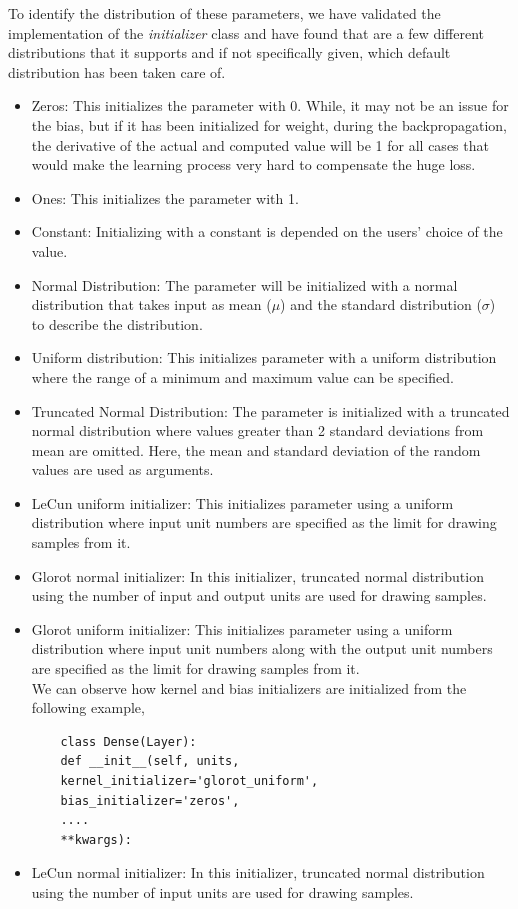 To identify the distribution of these parameters, we have validated the implementation of the \emph{initializer} class and have found that are a few different distributions that it supports and if not specifically given, which default distribution has been taken care of.
\begin{itemize}
	\item Zeros: This initializes the parameter with 0. While, it may not be an issue for the bias, but if it has been initialized for weight, during the backpropagation, the derivative of the actual and computed value will be 1 for all cases that would make the learning process very hard to compensate the huge loss.
	\item Ones: This initializes the parameter with 1.
	\item Constant: Initializing with a constant is depended on the users' choice of the value.
	\item Normal Distribution: The parameter will be initialized with a normal distribution that takes input as mean ($\mu$) and the standard distribution ($\sigma$) to describe the distribution.
	\item Uniform distribution: This initializes parameter with a uniform distribution where the range of a minimum and maximum value can be specified.
	\item Truncated Normal Distribution: The parameter is initialized with a truncated normal distribution where values greater than 2 standard deviations from mean are omitted. Here, the mean and standard deviation of the random values are used as arguments.
	\item LeCun uniform initializer: This initializes parameter using a uniform distribution where input unit numbers are specified as the limit for drawing samples from it.
	\item Glorot normal initializer: In this initializer, truncated normal distribution using the number of input and output units are used for drawing samples. 
	\item Glorot uniform initializer: This initializes parameter using a uniform distribution where input unit numbers along with the output unit numbers are specified as the limit for drawing samples from it. \\
	We can observe how kernel and bias initializers are initialized from the following example,
	\begin{lstlisting}
	class Dense(Layer):
	def __init__(self, units,
	kernel_initializer='glorot_uniform',
	bias_initializer='zeros',
	....
	**kwargs):\end{lstlisting}
	\item LeCun normal initializer: In this initializer, truncated normal distribution using the number of input units are used for drawing samples.
\end{itemize}
